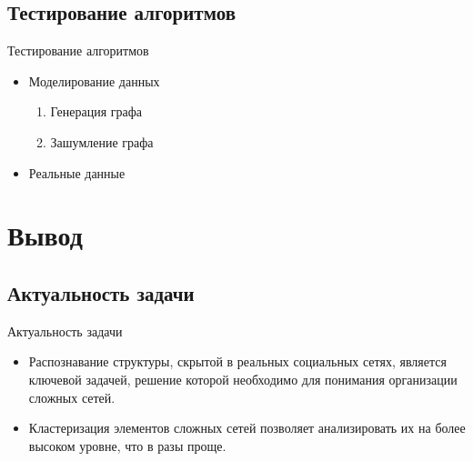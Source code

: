 \documentclass[11pt,pdf,hyperref={unicode}]{beamer}
\begin{document}
	\subsection{Тестирование алгоритмов} %
	\label{sub:testing}
		\begin{frame}{Тестирование алгоритмов}
			\begin{itemize}
				\item Моделирование данных
				\begin{enumerate}
					\item Генерация графа
					\item Зашумление графа
				\end{enumerate}
				\pause \item Реальные данные
			\end{itemize}
		\end{frame}


\section{Вывод} %
\label{sec:outro}

	\subsection{Актуальность задачи} %
	\label{sub:actual}
		\begin{frame}{Актуальность задачи}
			\begin{itemize}
				\item Распознавание структуры, скрытой в реальных социальных сетях, является ключевой задачей, решение которой необходимо для понимания организации сложных сетей.
				\pause \item Кластеризация элементов сложных сетей позволяет анализировать их на более высоком уровне, что в разы проще.
			\end{itemize}
		\end{frame}

	
\end{document}
